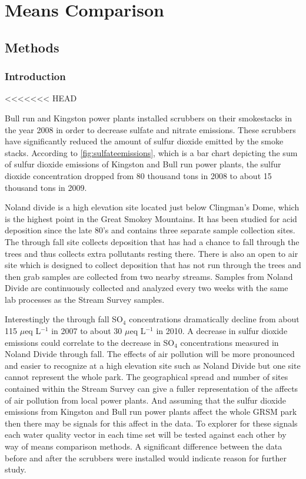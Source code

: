 \chapter{Means Comparison}\label{ch:mc}
\section{Methods}
\subsection{Introduction}
<<<<<<< HEAD

Bull run and Kingston power plants installed scrubbers on their smokestacks in the year 2008 in order to decrease sulfate and nitrate emissions.
These scrubbers have significantly reduced the amount of sulfur dioxide emitted by the smoke stacks.
According to \autoref{fig:sulfateemissions}, which is a bar chart depicting the sum of sulfur dioxide emissions of Kingston and Bull run power plants,  the sulfur dioxide concentration dropped from 80 thousand tons in 2008 to about 15 thousand tons in 2009.

Noland divide is a high elevation site located just below Clingman's Dome, which is the highest point in the Great Smokey Mountains.  
It has been studied for acid deposition since the late 80's and contains three separate sample collection sites.
The through fall site collects deposition that has had a chance to fall through the trees and thus collects extra pollutants resting there.
There is also an open to air site which is designed to collect deposition that has not run through the trees and then grab samples are collected from two nearby streams.
Samples from Noland Divide are continuously collected and analyzed every two weeks with the same lab processes as the Stream Survey samples.

Interestingly the through fall SO$_4$ concentrations dramatically decline from about 115 $\mu$eq L$^{-1}$ in 2007 to about 30 $\mu$eq L$^{-1}$ in 2010.
A decrease in sulfur dioxide emissions could correlate to the decrease in SO$_4$ concentrations measured in Noland Divide through fall.
The effects of air pollution will be more pronounced and easier to recognize at a high elevation site such as Noland Divide but one site cannot represent the whole park.
The geographical spread and number of sites contained within the Stream Survey can give a fuller representation of the affects of air pollution from local power plants.
And assuming that the sulfur dioxide emissions from Kingston and Bull run power plants affect the whole GRSM park then there may be signals for this affect in the data.
To explorer for these signals each water quality vector in each time set will be tested against each other by way of means comparison methods.
A significant difference between the data before and after the scrubbers were installed would indicate reason for further study.

